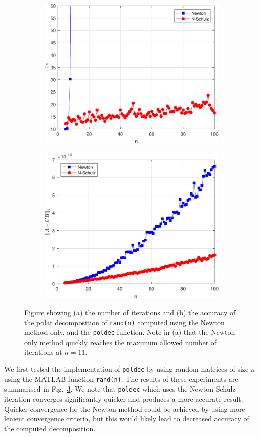 \documentclass[10pt, A4paper]{article}
\begin{document}
\begin{figure}[t]
	\centering
	\begin{subfigure}{0.5\textwidth}
		\centering
		\includegraphics[width=.8\linewidth]{randnIts.pdf}
		\caption{\label{fig:randnIts}}
	\end{subfigure}%
	\begin{subfigure}{0.5\textwidth}
		\centering
		\includegraphics[width=.8\linewidth]{randnAccuracy.pdf}
		\caption{\label{fig:randnAccuracy}}
	\end{subfigure}
	\caption{
	Figure showing (a) the number of iterations and 
	(b) the accuracy of the polar decomposition of 
	\texttt{rand(n)} computed using the Newton method only, and the 
	\texttt{poldec} function. Note in (a) that the Newton only method 
	quickly reaches the maximum allowed number of iterations at $n = 
	11$.
	\label{fig:randn}}
\end{figure}
We first tested the implementation of \texttt{poldec} by using random 
matrices of size $n$ using the MATLAB function \texttt{rand(n)}. The 
results of these experiments are summarised in Fig.~\ref{fig:randn}.
We note that \texttt{poldec} which uses the Newton-Schulz iteration 
converges significantly quicker and produces a more accurate result.
Quicker convergence for the Newton method could be achieved by using 
more lenient convergence criteria, but this would likely lead 
to decreased accuracy of the computed decomposition. 
\end{document}
